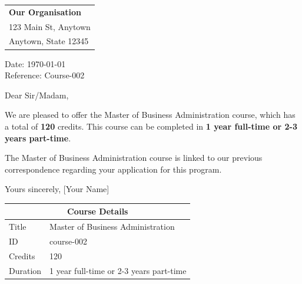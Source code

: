 \documentclass{article}
\begin{document}
\begin{tabular}{@{}l@{}}
\textbf{Our Organisation} \\
123 Main St, Anytown \\
Anytown, State 12345 \\
\end{tabular}\par
\vspace{-1em}
Date: \today \\
Reference: Course-002

Dear Sir/Madam,

We are pleased to offer the Master of Business Administration course, which has a total of \textbf{120} credits. This course can be completed in \textbf{1 year full-time or 2-3 years part-time}.

The Master of Business Administration course is linked to our previous correspondence regarding your application for this program.

Yours sincerely,
[Your Name]

\begin{tabular}{|l|l|}
\hline
\multicolumn{2}{|c|}{\textbf{Course Details}} \\
\hline
Title & Master of Business Administration \\
\hline
ID & course-002 \\
\hline
Credits & 120 \\
\hline
Duration & 1 year full-time or 2-3 years part-time \\
\hline
\end{tabular}
\end{document}
